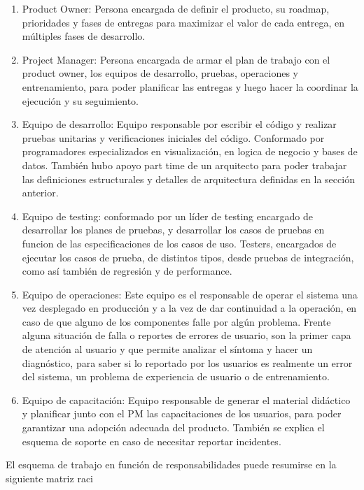 \begin{enumerate}
    \item Product Owner: Persona encargada de definir el producto, su roadmap, prioridades y fases de entregas para maximizar el valor de cada entrega, en múltiples fases de desarrollo.
    \item Project Manager: Persona encargada de armar el plan de trabajo con el product owner, los equipos de desarrollo, pruebas, operaciones y entrenamiento, para poder planificar las entregas y luego hacer la coordinar la ejecución y su seguimiento.
    \item Equipo de desarrollo: Equipo responsable por escribir el código y realizar pruebas unitarias y verificaciones iniciales del código. Conformado por programadores especializados en visualización, en logica de negocio y bases de datos. También hubo apoyo part time de un arquitecto para poder trabajar las definiciones estructurales y detalles de arquitectura definidas en la sección anterior.
    \item Equipo de testing: conformado por un líder de testing encargado de desarrollar los planes de pruebas, y desarrollar los casos de pruebas en funcion de las especificaciones de los casos de uso. Testers, encargados de ejecutar los casos de prueba, de distintos tipos, desde pruebas de integración, como así también de regresión y de performance.
    \item Equipo de operaciones: Este equipo es el responsable de operar el sistema una vez desplegado en producción y a la vez de dar continuidad a la operación, en caso de que alguno de los componentes falle por algún problema. Frente alguna situación de falla o reportes de errores de usuario, son la primer capa de atención al usuario y que permite analizar el síntoma y hacer un diagnóstico, para saber si lo reportado por los usuarios es realmente un error del sistema, un problema de experiencia de usuario o de entrenamiento.
    \item Equipo de capacitación: Equipo responsable de generar el material didáctico y planificar junto con el PM las capacitaciones de los usuarios, para poder garantizar una adopción adecuada del producto. También se explica el esquema de soporte en caso de necesitar reportar incidentes.
\end{enumerate}

\newpage
El esquema de trabajo en función de responsabilidades puede resumirse en la siguiente matriz \gls{raci}


